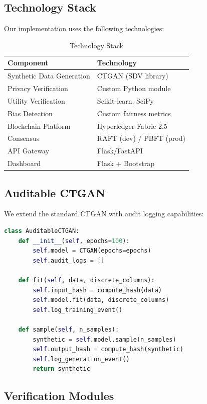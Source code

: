 
\subsection{Technology Stack}

Our implementation uses the following technologies:

\begin{table}[h]
\centering
\caption{Technology Stack}
\begin{tabular}{ll}
\toprule
\textbf{Component} & \textbf{Technology} \\
\midrule
Synthetic Data Generation & CTGAN (SDV library) \\
Privacy Verification & Custom Python module \\
Utility Verification & Scikit-learn, SciPy \\
Bias Detection & Custom fairness metrics \\
Blockchain Platform & Hyperledger Fabric 2.5 \\
Consensus & RAFT (dev) / PBFT (prod) \\
API Gateway & Flask/FastAPI \\
Dashboard & Flask + Bootstrap \\
\bottomrule
\end{tabular}
\end{table}

\subsection{Auditable CTGAN}

We extend the standard CTGAN with audit logging capabilities:

\begin{lstlisting}[language=Python, caption=Auditable CTGAN Structure]
class AuditableCTGAN:
    def __init__(self, epochs=100):
        self.model = CTGAN(epochs=epochs)
        self.audit_logs = []
        
    def fit(self, data, discrete_columns):
        self.input_hash = compute_hash(data)
        self.model.fit(data, discrete_columns)
        self.log_training_event()
        
    def sample(self, n_samples):
        synthetic = self.model.sample(n_samples)
        self.output_hash = compute_hash(synthetic)
        self.log_generation_event()
        return synthetic
\end{lstlisting}

\subsection{Verification Modules}

